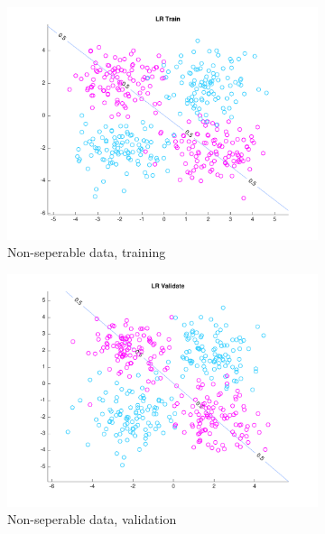 \begin{figure}[h!]
    \begin{subfigure}[b]{0.4\textwidth}
	\includegraphics[scale=0.4]{hw2_1_nonsep_a.pdf}
	\caption{Non-seperable data, training}\label{fig:data_nonsep_a}
    \end{subfigure}  
    \quad
    \begin{subfigure}[b]{0.4\textwidth}
	\includegraphics[scale=0.4]{hw2_1_nonsep_b.pdf}
	\caption{Non-seperable data, validation}\label{fig:data_nonsep_b}
    \end{subfigure}  
    \caption{}    
\end{figure}


